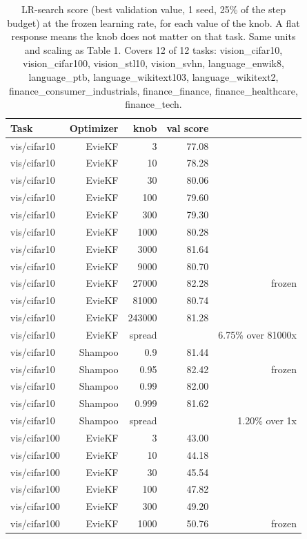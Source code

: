 \begin{table}[t]
\centering
\small
\caption{LR-search score (best validation value, 1 seed, 25\% of the step budget) at the frozen learning rate, for each value of the knob. A flat response means the knob does not matter on that task. Same units and scaling as Table 1. Covers 12 of 12 tasks: vision\_cifar10, vision\_cifar100, vision\_stl10, vision\_svhn, language\_enwik8, language\_ptb, language\_wikitext103, language\_wikitext2, finance\_consumer\_industrials, finance\_finance, finance\_healthcare, finance\_tech.}
\label{tab:table7_knob_sensitivity}
\begin{tabular}{lrrrr}
\toprule
Task & Optimizer & knob & val score &  \\
\midrule
vis/cifar10 & EvieKF & 3 & 77.08 &  \\
vis/cifar10 & EvieKF & 10 & 78.28 &  \\
vis/cifar10 & EvieKF & 30 & 80.06 &  \\
vis/cifar10 & EvieKF & 100 & 79.60 &  \\
vis/cifar10 & EvieKF & 300 & 79.30 &  \\
vis/cifar10 & EvieKF & 1000 & 80.28 &  \\
vis/cifar10 & EvieKF & 3000 & 81.64 &  \\
vis/cifar10 & EvieKF & 9000 & 80.70 &  \\
vis/cifar10 & EvieKF & 27000 & 82.28 & frozen \\
vis/cifar10 & EvieKF & 81000 & 80.74 &  \\
vis/cifar10 & EvieKF & 243000 & 81.28 &  \\
vis/cifar10 & EvieKF & spread &  & 6.75\% over 81000x \\
vis/cifar10 & Shampoo & 0.9 & 81.44 &  \\
vis/cifar10 & Shampoo & 0.95 & 82.42 & frozen \\
vis/cifar10 & Shampoo & 0.99 & 82.00 &  \\
vis/cifar10 & Shampoo & 0.999 & 81.62 &  \\
vis/cifar10 & Shampoo & spread &  & 1.20\% over 1x \\
vis/cifar100 & EvieKF & 3 & 43.00 &  \\
vis/cifar100 & EvieKF & 10 & 44.18 &  \\
vis/cifar100 & EvieKF & 30 & 45.54 &  \\
vis/cifar100 & EvieKF & 100 & 47.82 &  \\
vis/cifar100 & EvieKF & 300 & 49.20 &  \\
vis/cifar100 & EvieKF & 1000 & 50.76 & frozen \\

\end{tabular}
\end{table}
